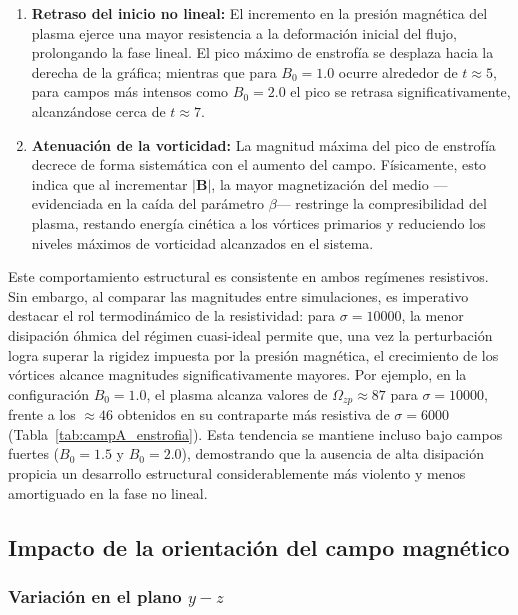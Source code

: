 \begin{enumerate}
    \item \textbf{Retraso del inicio no lineal:} El incremento en la presión magnética del plasma ejerce una mayor resistencia a la deformación inicial del flujo, prolongando la fase lineal. El pico máximo de enstrofía se desplaza hacia la derecha de la gráfica; mientras que para $B_0=1.0$ ocurre alrededor de $t \approx 5$, para campos más intensos como $B_0=2.0$ el pico se retrasa significativamente, alcanzándose cerca de $t \approx 7$.
    \item \textbf{Atenuación de la vorticidad:} La magnitud máxima del pico de enstrofía decrece de forma sistemática con el aumento del campo. Físicamente, esto indica que al incrementar $|\mathbf{B}|$, la mayor magnetización del medio ---evidenciada en la caída del parámetro $\beta$--- restringe la compresibilidad del plasma, restando energía cinética a los vórtices primarios y reduciendo los niveles máximos de vorticidad alcanzados en el sistema.
\end{enumerate}

Este comportamiento estructural es consistente en ambos regímenes resistivos. Sin embargo, al comparar las magnitudes entre simulaciones, es imperativo destacar el rol termodinámico de la resistividad: para $\sigma=10000$, la menor disipación óhmica del régimen cuasi-ideal permite que, una vez la perturbación logra superar la rigidez impuesta por la presión magnética, el crecimiento de los vórtices alcance magnitudes significativamente mayores. Por ejemplo, en la configuración $B_0=1.0$, el plasma alcanza valores de $\Omega_{zp} \approx 87$ para $\sigma=10000$, frente a los $\approx 46$ obtenidos en su contraparte más resistiva de $\sigma=6000$ (Tabla~\ref{tab:campA_enstrofia}). Esta tendencia se mantiene incluso bajo campos fuertes ($B_0=1.5$ y $B_0=2.0$), demostrando que la ausencia de alta disipación propicia un desarrollo estructural considerablemente más violento y menos amortiguado en la fase no lineal.

\subsection{Impacto de la orientación del campo magnético}

\subsubsection{Variación en el plano $y-z$}

